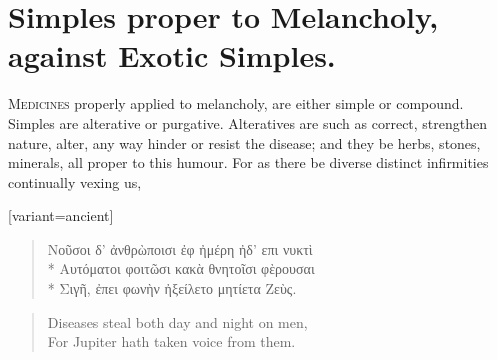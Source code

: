 {%
\section{Simples proper to Melancholy, against Exotic Simples.}

\lettrine{M}{edicines} properly applied to melancholy, are either simple or
compound. Simples are alterative or purgative. Alteratives are such as
correct, strengthen nature, alter, any way hinder or resist the
disease; and they be herbs, stones, minerals, \etc{} all proper to this
humour. For as there be diverse distinct infirmities continually vexing
us,

\begin{greek}[variant=ancient]
\begin{verse}
Νοῦσοι δ' ἀνθρὼποισι ἐφ ἠμέρη ἠδ' επι νυκτὶ\\*
Αυτόματοι φοιτῶσι κακὰ θνητοῖσι φὲρουσαι\\*
Σιγῆ, ἐπει φωνὴν ἠξείλετο μητίετα Ζεὺς.
\end{verse}
\end{greek}

\begin{verse}
Diseases steal both day and night on men,\\
For Jupiter hath taken voice from them.
\end{verse}

}
